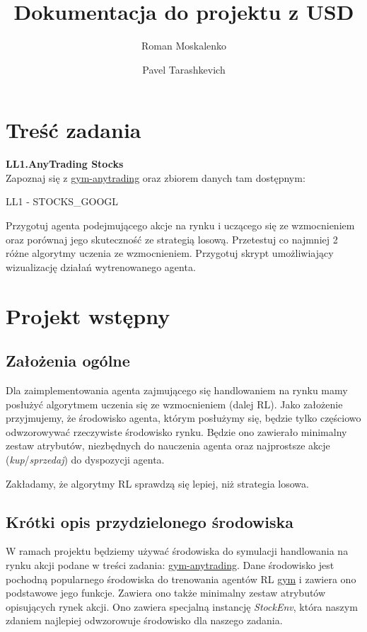\documentclass[12pt,a4paper]{article}
\title{Dokumentacja do projektu z USD}
\author{Roman Moskalenko \and Pavel Tarashkevich}
\date{}
\begin{document}
\maketitle

\section{Treść zadania}

\textbf{LL1.AnyTrading Stocks}\\

Zapoznaj się z \href{https://github.com/AminHP/gym-anytrading}{gym-anytrading} oraz
zbiorem danych tam dostępnym:

LL1 - STOCKS\_GOOGL

Przygotuj agenta podejmującego akcje na rynku i uczącego się ze wzmocnieniem
oraz porównaj jego skuteczność ze strategią losową. Przetestuj co najmniej 2 różne
algorytmy uczenia ze wzmocnieniem. Przygotuj skrypt umożliwiający wizualizację
działań wytrenowanego agenta.

\section{Projekt wstępny}

\subsection{Założenia ogólne}

Dla zaimplementowania agenta zajmującego się handlowaniem na rynku mamy
posłużyć algorytmem uczenia się ze wzmocnieniem (dalej RL). Jako założenie przyjmujemy,
że środowisko agenta, którym posłużymy się, będzie tylko częściowo odwzorowywać 
rzeczywiste środowisko rynku. Będzie ono zawierało minimalny zestaw 
atrybutów, niezbędnych do nauczenia agenta oraz najprostsze akcje 
(\emph{kup}/\emph{sprzedaj}) do dyspozycji agenta.

Zakładamy, że algorytmy RL sprawdzą się lepiej, niż strategia losowa.

\subsection{Krótki opis przydzielonego środowiska}

W ramach projektu będziemy używać środowiska do symulacji handlowania 
na rynku akcji podane w treści zadania: \href{https://github.com/AminHP/gym-anytrading}{gym-anytrading}.
Dane środowisko jest pochodną popularnego środowiska do trenowania agentów
RL \href{https://github.com/openai/gym}{gym} i zawiera ono podstawowe 
jego funkcje. Zawiera ono także minimalny zestaw atrybutów opisujących 
rynek akcji. Ono zawiera specjalną instancję \mbox{\emph{StockEnv}}, 
która naszym zdaniem najlepiej odwzorowuje środowisko dla naszego 
zadania.
\end{document}
